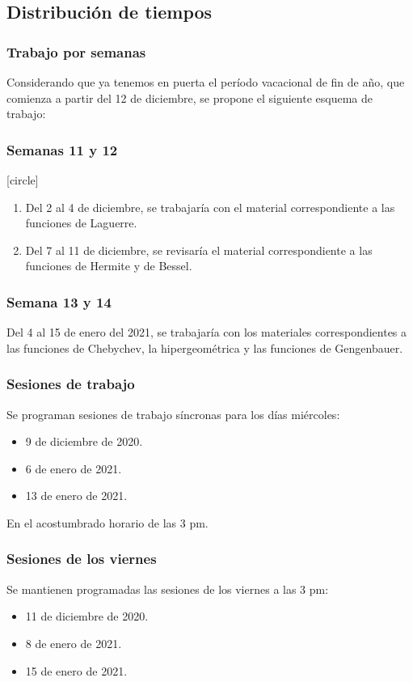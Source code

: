 \subsection{Distribución de tiempos}
\begin{frame}
\frametitle{Trabajo por semanas}
Considerando que ya tenemos en puerta el período vacacional de fin de año, que comienza a partir del 12 de diciembre, se propone el siguiente esquema de trabajo:
\end{frame}
\begin{frame}
\frametitle{Semanas 11 y 12}
[circle]
\begin{enumerate}[<+->]
\item Del 2 al 4 de diciembre, se trabajaría con el material correspondiente a las funciones de Laguerre.
\item Del 7 al 11 de diciembre, se revisaría el material correspondiente a las funciones de Hermite y de Bessel.
\end{enumerate}
\end{frame}
\begin{frame}
\frametitle{Semana 13 y 14}
Del 4 al 15 de enero del 2021, se trabajaría con los materiales correspondientes a las funciones de Chebychev, la hipergeométrica y las funciones de Gengenbauer.
\end{frame}
\begin{frame}
\frametitle{Sesiones de trabajo}
Se programan sesiones de trabajo síncronas para los días miércoles:
\begin{itemize}
\item 9 de diciembre de 2020.
\item 6 de enero de 2021.
\item 13 de enero de 2021.
\end{itemize}
En el acostumbrado horario de las 3 pm.
\end{frame}
\begin{frame}
\frametitle{Sesiones de los viernes}
Se mantienen programadas las sesiones de los viernes a las 3 pm:
\begin{itemize}
\item 11 de diciembre de 2020.
\item 8 de enero de 2021.
\item 15 de enero de 2021.
\end{itemize}
\end{frame}
